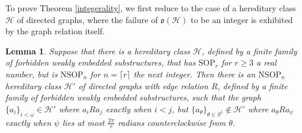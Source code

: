 \documentclass{amsart}
\newtheorem{lemma}[theorem]{Lemma}
\theoremstyle{definition}
\theoremstyle{remark}
\numberwithin{equation}{section}
\begin{document}
To prove Theorem \ref{integerality}, we first reduce to the case of a hereditary class $\mathcal{H}$ of directed graphs, where the failure of $\mathfrak{o}(\mathcal{H})$ to be an integer is exhibited by the graph relation itself.

\begin{lemma}\label{reduction to directed graph defined by a finite family of forbidden weakly embedded substructures}
    Suppose that there is a hereditary class $\mathcal{H}$, defined by a finite family of forbidden weakly embedded substructures, that has $\mathrm{SOP}_{r}$ for $r \geq 3$ a real number, but is $\mathrm{NSOP}_{n}$ for $n = \lceil r \rceil $ the next integer. Then there is an $\mathrm{NSOP}_{n}$ hereditary class $\mathcal{H}'$ of directed graphs with edge relation $R$, defined by a finite family of forbidden weakly embedded substructures, such that the graph $\{a_{i}\}_{i < \omega} \in \mathcal{H}'$ where $a_{i} R a_{j}$ exactly when $i < j$, but $\{a_{\theta}\}_{\theta \in S^{1}} \notin \mathcal{H}'$ where $a_{\theta} R a_{\psi}$ exactly when $\psi$ lies at most $\frac{2\pi}{r}$ radians counterclockwise from $\theta$.
\end{lemma}
\end{document}
